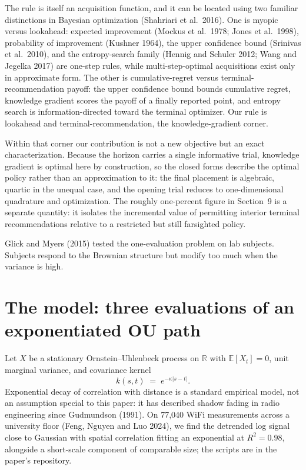 \documentclass[11pt]{article}
\theoremstyle{itheads}
\newcommand{\E}{\mathbb{E}}
\newcommand{\R}{\mathbb{R}}
\begin{document}
The rule is itself an acquisition function, and it can be located
using two familiar distinctions in Bayesian optimization (Shahriari et
al.\ 2016). One is myopic versus lookahead: expected
improvement (Mockus et al.\ 1978; Jones et al.\ 1998), probability of
improvement (Kushner 1964), the upper confidence bound (Srinivas et
al.\ 2010), and the entropy-search family (Hennig and Schuler 2012;
Wang and Jegelka 2017) are one-step rules, while multi-step-optimal
acquisitions exist only in approximate form. The other is
cumulative-regret versus terminal-recommendation payoff: the upper
confidence bound bounds cumulative regret, knowledge gradient scores
the payoff of a finally reported point, and entropy search is
information-directed toward the terminal optimizer. Our rule is
lookahead and terminal-recommendation, the knowledge-gradient corner.

Within that corner our contribution is not a new objective but an
exact characterization. Because the horizon carries a single
informative trial, knowledge gradient is optimal here by construction,
so the closed forms describe the optimal policy rather than an
approximation to it: the final placement is algebraic, quartic in the
unequal case, and the opening trial reduces to one-dimensional
quadrature and optimization. The roughly one-percent figure in
Section~9 is a separate quantity: it isolates the incremental value of
permitting interior terminal recommendations relative to a restricted
but still farsighted policy.

Glick and Myers (2015) tested the one-evaluation problem on lab
subjects. Subjects respond to the Brownian structure but modify too
much when the variance is high.

\section{The model: three evaluations of an exponentiated OU path}

Let $X$ be a stationary Ornstein--Uhlenbeck process on $\R$ with
$\E[X_t]=0$, unit marginal variance, and covariance kernel
\begin{equation}
k(s,t) \;=\; e^{-\kappa|s-t|}.
\end{equation}
Exponential decay of correlation with distance is a standard
empirical model, not an assumption special to this paper: it has
described shadow fading in radio engineering since Gudmundson
(1991). On 77{,}040 WiFi measurements across a university floor
(Feng, Nguyen and Luo 2024), we find the detrended log signal close
to Gaussian with spatial correlation fitting an exponential at
$R^{2}=0.98$, alongside a short-scale component of comparable size;
the scripts are in the paper's repository.
\end{document}
